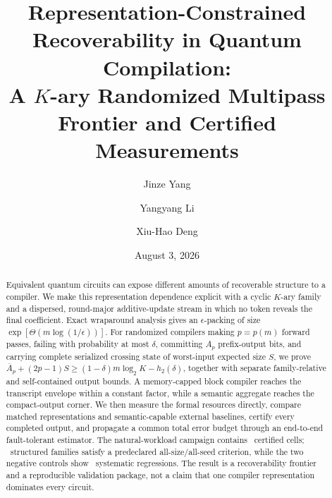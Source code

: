 \documentclass[aps,prx,reprint,floatfix,superscriptaddress]{revtex4-2}
\begin{document}
\title{Representation-Constrained Recoverability in Quantum Compilation:\\
A $K$-ary Randomized Multipass Frontier and Certified Measurements}

\author{Jinze Yang}

\author{Yangyang Li}

\author{Xiu-Hao Deng}

\date{August 3, 2026}

\begin{abstract}
Equivalent quantum circuits can expose different amounts of recoverable
structure to a compiler.  We make this representation dependence explicit
with a cyclic $K$-ary family and a dispersed, round-major additive-update
stream in which no token reveals the final coefficient.  Exact wraparound
analysis gives an $\epsilon$-packing of size
$\exp[\Theta(m\log(1/\epsilon))]$.  For randomized compilers making
$p=p(m)$ forward passes, failing with probability at most $\delta$, committing
$A_p$ prefix-output bits, and carrying complete serialized crossing state of
worst-input expected size $S$, we prove
\(
 \overline A_p+(2p-1)S\geq
 (1-\delta)m\log_2K-h_2(\delta)
\), together with separate family-relative and self-contained output bounds.
A memory-capped block compiler reaches the transcript envelope within a
constant factor, while a semantic aggregate reaches the compact-output
corner.  We then measure the formal resources directly, compare matched
representations and semantic-capable external baselines, certify every
completed output, and propagate a common total error budget through an
end-to-end fault-tolerant estimator.  The natural-workload campaign contains
\NaturalCells\ certified cells; \NaturalStableFamilies\ structured families
satisfy a predeclared all-size/all-seed criterion, while the two negative
controls show \NaturalNegativeRegressions\ systematic regressions.  The
result is a recoverability frontier and a reproducible validation package,
not a claim that one compiler representation dominates every circuit.
\end{abstract}
\end{document}
